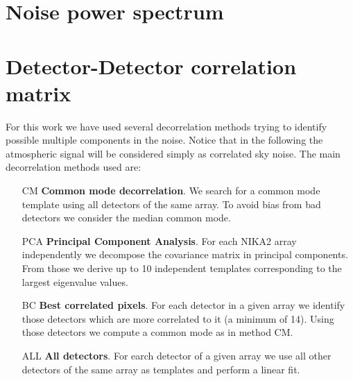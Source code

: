 %
%
%
%


%
%    
%
\section{Noise power spectrum}


%
%
%

\section{Detector-Detector correlation matrix}

For this work we have used several decorrelation methods trying to identify possible multiple components in the noise. Notice that in the following the atmospheric signal will be considered simply as correlated sky noise. The main decorrelation methods used are:

\begin{enumerate}
\item[CM] {\bf Common mode decorrelation}. We search for a common mode template using all detectors of the same array. To avoid bias from bad detectors we consider the median common mode.

\item[PCA] {\bf Principal Component Analysis}. For each NIKA2 array independently we decompose the covariance matrix in principal components. From those we derive up to 10 independent templates corresponding to the largest eigenvalue values.

\item[BC] {\bf Best correlated pixels}. For each detector in a given array we identify those detectors which are more correlated to it (a minimum of 14). Using those detectors we compute a common mode as in method CM. 

\item[ALL] {\bf All detectors}. For earch detector of a given array we use all other detectors of the same array as templates and perform a linear fit.

\end{enumerate}

